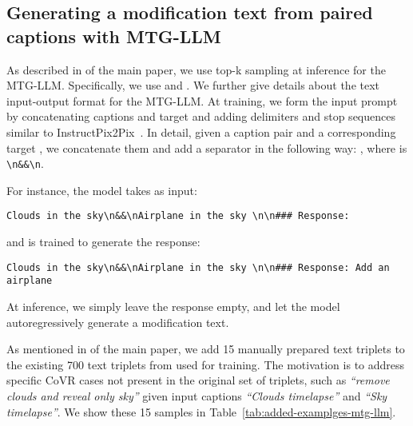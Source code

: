 \subsection{Generating a modification text from paired captions with MTG-LLM}
\label{app:subsec:mtg-llm}
As described in
\if{} \fi
of the main paper,
we use top-k sampling at inference for the MTG-LLM. 
Specifically, we use  and .
We further give details about the text input-output format for the MTG-LLM.
At training, we form the input prompt by concatenating captions and target and adding delimiters and stop sequences similar to InstructPix2Pix~\cite{brooks2022instructpix2pix}.
In detail, given a caption pair  and a corresponding target , we concatenate them and add a separator in the following way: ,
where  is \texttt{\textbackslash n\&\&\textbackslash n}.

For instance, the model takes as input:
\begin{lstlisting}[breaklines, backgroundcolor = \color{backcolour}]
    Clouds in the sky\n&&\nAirplane in the sky \n\n### Response:
\end{lstlisting}
and is trained to generate the response:
\begin{lstlisting}[breaklines, backgroundcolor = \color{backcolour}]
    Clouds in the sky\n&&\nAirplane in the sky \n\n### Response: Add an airplane
\end{lstlisting}
At inference, we simply leave the response empty, and let the model autoregressively generate a modification text.

As mentioned in
\if{} \fi
of the main paper, we add 15 manually prepared text triplets to the existing 
700 text triplets from \cite{brooks2022instructpix2pix} used for training.
The motivation is to address specific
CoVR cases not present in the original set of triplets, such as \textit{``remove clouds and reveal only sky''} 
given input captions \textit{``Clouds timelapse''} and \textit{``Sky timelapse''}.
We show these 15 samples in Table~\ref{tab:added-examplges-mtg-llm}.


